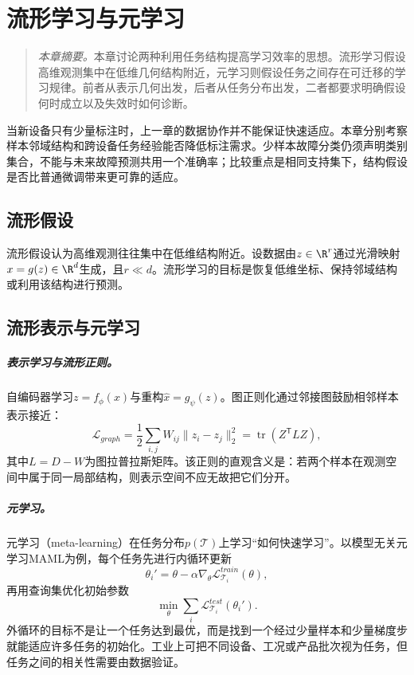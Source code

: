 \chapter{流形学习与元学习}
\begin{quote}\small
\textit{本章摘要。}本章讨论两种利用任务结构提高学习效率的思想。流形学习假设高维观测集中在低维几何结构附近，元学习则假设任务之间存在可迁移的学习规律。前者从表示几何出发，后者从任务分布出发，二者都要求明确假设何时成立以及失效时如何诊断。
\end{quote}
当新设备只有少量标注时，上一章的数据协作并不能保证快速适应。本章分别考察样本邻域结构和跨设备任务经验能否降低标注需求。少样本故障分类仍须声明类别集合，不能与未来故障预测共用一个准确率；比较重点是相同支持集下，结构假设是否比普通微调带来更可靠的适应。
\section{流形假设}
流形假设认为高维观测往往集中在低维结构附近。设数据由$z\in\R^r$通过光滑映射$x=g(z)\in\R^d$生成，且$r\ll d$。流形学习的目标是恢复低维坐标、保持邻域结构或利用该结构进行预测。

\section{流形表示与元学习}
\paragraph{表示学习与流形正则。}
自编码器学习$z=f_\phi(x)$与重构$\hat{x}=g_\psi(z)$。图正则化通过邻接图鼓励相邻样本表示接近：
\begin{equation}
 \mathcal{L}_{graph}=\frac12\sum_{i,j}W_{ij}\|z_i-z_j\|_2^2
 =\operatorname{tr}(Z^{\mathsf T}LZ),
\end{equation}
其中$L=D-W$为图拉普拉斯矩阵。该正则的直观含义是：若两个样本在观测空间中属于同一局部结构，则表示空间不应无故把它们分开。

\paragraph{元学习。}
元学习（meta-learning）在任务分布$p(\mathcal{T})$上学习“如何快速学习”。以模型无关元学习MAML为例，每个任务先进行内循环更新
\begin{equation}
 \theta_i'=\theta-\alpha\nabla_\theta\mathcal{L}_{\mathcal{T}_i}^{train}(\theta),
\end{equation}
再用查询集优化初始参数
\begin{equation}
 \min_\theta\sum_i\mathcal{L}_{\mathcal{T}_i}^{test}(\theta_i').
\end{equation}
外循环的目标不是让一个任务达到最优，而是找到一个经过少量样本和少量梯度步就能适应许多任务的初始化。工业上可把不同设备、工况或产品批次视为任务，但任务之间的相关性需要由数据验证。

